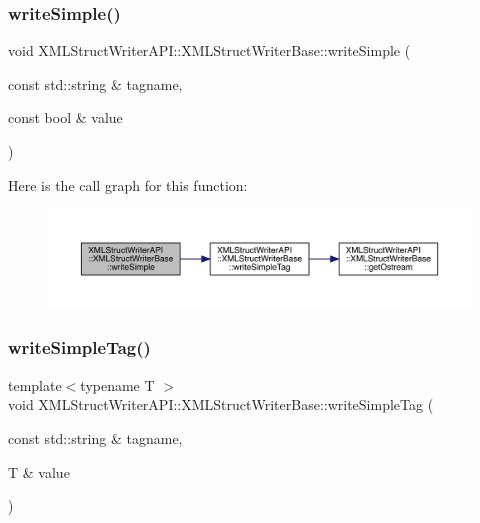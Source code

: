 \subsubsection{\texorpdfstring{writeSimple()}{writeSimple()}\hspace{0.1cm}{\footnotesize\ttfamily [8/8]}}
{\footnotesize\ttfamily void X\+M\+L\+Struct\+Writer\+A\+P\+I\+::\+X\+M\+L\+Struct\+Writer\+Base\+::write\+Simple (\begin{DoxyParamCaption}\item[{const std\+::string \&}]{tagname,  }\item[{const bool \&}]{value }\end{DoxyParamCaption})\hspace{0.3cm}{\ttfamily [inline]}}

Here is the call graph for this function\+:
\nopagebreak
\begin{figure}[H]
\begin{center}
\leavevmode
\includegraphics[width=350pt]{db/d4f/classXMLStructWriterAPI_1_1XMLStructWriterBase_a8e5e47c565c73791739d298b697d66f8_cgraph}
\end{center}
\end{figure}
\mbox{\label{classXMLStructWriterAPI_1_1XMLStructWriterBase_a049c80e79c8f64d2b6b0221c01392d37}} 
\subsubsection{\texorpdfstring{writeSimpleTag()}{writeSimpleTag()}\hspace{0.1cm}{\footnotesize\ttfamily [1/2]}}
{\footnotesize\ttfamily template$<$typename T $>$ \\
void X\+M\+L\+Struct\+Writer\+A\+P\+I\+::\+X\+M\+L\+Struct\+Writer\+Base\+::write\+Simple\+Tag (\begin{DoxyParamCaption}\item[{const std\+::string \&}]{tagname,  }\item[{T \&}]{value }\end{DoxyParamCaption})\hspace{0.3cm}{\ttfamily [inline]}}

